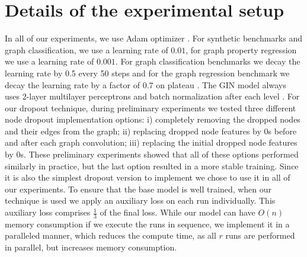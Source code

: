 \documentclass{article}
\begin{document}
\section{Details of the experimental setup}


In all of our experiments, we use Adam optimizer \citep{kingma2015adam}. For synthetic benchmarks and graph classification, we use a learning rate of $0.01$, for graph property regression we use a learning rate of $0.001$. For graph classification benchmarks we decay the learning rate by 0.5 every 50 steps \citep{GIN} and for the graph regression benchmark we decay the learning rate by a factor of $0.7$ on plateau \citep{morris2019weisfeiler}. The GIN model always uses 2-layer multilayer perceptrons and batch normalization \citep{ioffe2015batch} after each level \citep{GIN}. For our dropout technique, during preliminary experiments we tested three different node dropout implementation options: i) completely removing the dropped nodes and their edges from the graph; ii) replacing dropped node features by 0s before and after each graph convolution; iii) replacing the initial dropped node features by 0s. These preliminary experiments showed that all of these options performed similarly in practice, but the last option resulted in a more stable training. Since it is also the simplest dropout version to implement we chose to use it in all of our experiments. To ensure that the base model is well trained, when our technique is used we apply an auxiliary loss on each run individually. This auxiliary loss comprises $\frac{1}{3}$ of the final loss. While our model can have $O(n)$ memory consumption if we execute the runs in sequence, we implement it in a paralleled manner, which reduces the compute time, as all $r$ runs are performed in parallel, but increases memory consumption.
\end{document}
